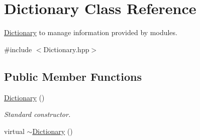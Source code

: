 \hypertarget{class_dictionary}{\section{Dictionary Class Reference}
\label{class_dictionary}
}


\hyperlink{class_dictionary}{Dictionary} to manage information provided by modules.  




{\ttfamily \#include $<$Dictionary.\-hpp$>$}

\subsection*{Public Member Functions}
\begin{DoxyCompactItemize}
\item 
\hyperlink{class_dictionary_aee8d612bc9d323c38faba045ba384b8b}{Dictionary} ()
\begin{DoxyCompactList}\small\item\em Standard constructor. \end{DoxyCompactList}\item 
\hypertarget{class_dictionary_aa36f24073d9c9001768517aa2322cb82}{virtual \hyperlink{class_dictionary_aa36f24073d9c9001768517aa2322cb82}{$\sim$\-Dictionary} ()}\label{class_dictionary_aa36f24073d9c9001768517aa2322cb82}


\end{DoxyCompactItemize}
